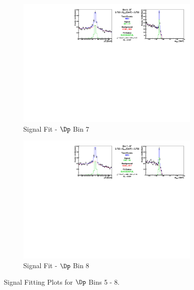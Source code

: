 \begin{figure}[h]
\begin{subfigure}[c]{0.99\textwidth}
\includegraphics[width=\textwidth]{figures/plots/fit_results/Dp_bin_06.pdf}
\caption*{Signal Fit - $\Dp$ Bin 7}
\end{subfigure}

\vspace{5pt}

\begin{subfigure}[c]{0.99\textwidth}
\includegraphics[width=\textwidth]{figures/plots/fit_results/Dp_bin_07.pdf}
\caption*{Signal Fit - $\Dp$ Bin 8}
\end{subfigure}

\caption{Signal Fitting Plots for $\Dp$ Bins 5 - 8.}
\label{fig:Dp_plots_5_8}

\end{figure}


